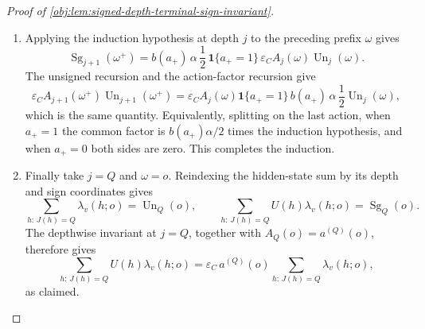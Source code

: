 \begin{proof}[Proof of \cref{obj:lem:signed-depth-terminal-sign-invariant}]
\begin{enumerate}
\item Applying the induction hypothesis at depth \(j\) to the preceding prefix \(\omega\) gives
\[
\operatorname{Sg}_{j+1}(\omega^+)
=
b(a_+)\,\alpha\,\frac12\,
\mathbf 1\{a_+=1\}\,
\varepsilon_C A_j(\omega)\operatorname{Un}_j(\omega).
\]
The unsigned recursion and the action-factor recursion give
\[
\varepsilon_C A_{j+1}(\omega^+)
\operatorname{Un}_{j+1}(\omega^+)
=
\varepsilon_C A_j(\omega)\mathbf 1\{a_+=1\}\,
 b(a_+)\,\alpha\,\frac12\operatorname{Un}_j(\omega),
\]
which is the same quantity.  Equivalently, splitting on the last action, when \(a_+=1\) the common factor is \(b(a_+)\alpha/2\) times the induction hypothesis, and when \(a_+=0\) both sides are zero.  This completes the induction.

\item Finally take \(j=Q\) and \(\omega=o\).  Reindexing the hidden-state sum by its depth and sign coordinates gives
\[
\sum_{h:\,J(h)=Q}\lambda_v(h;o)=\operatorname{Un}_Q(o),
\qquad
\sum_{h:\,J(h)=Q}U(h)\lambda_v(h;o)=\operatorname{Sg}_Q(o).
\]
The depthwise invariant at \(j=Q\), together with \(A_Q(o)=a^{(Q)}(o)\), therefore gives
\[
\sum_{h:\,J(h)=Q} U(h)\lambda_v(h;o)
=
\varepsilon_C\,a^{(Q)}(o)
\sum_{h:\,J(h)=Q}\lambda_v(h;o),
\]
as claimed.
\end{enumerate}
\end{proof}
